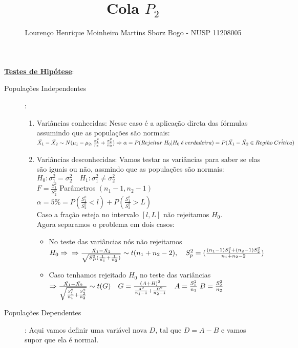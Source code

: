 \documentclass[12pt, oneside]{article}
\title{Cola $P_2$}
\author{Lourenço Henrique Moinheiro Martins Sborz Bogo - NUSP 11208005}
\newcommand{\mytitle}[1]{\textbf{\underline{#1}}}
\begin{document}
\maketitle
\mytitle{Testes de Hipótese}:\\
\begin{description}
\item[Populações Independentes]:
  \begin{enumerate}
  \item Variâncias conhecidas: Nesse caso é a aplicação direta das fórmulas assumindo que as populações são normais:\\
    $\bar{X_1}-\bar{X_2}\sim N(\mu_1-\mu_2,\frac{\sigma_1^2}{n_1}+\frac{\sigma_2^2}{n_2})\Rightarrow \alpha = P(Rejeitar \; H_0|H_0 \; \acute{e} \: verdadeira)\\ = P(\bar{X_1}-\bar{X_2} \in Regi\tilde{a}o\; Cr\acute{i}tica)$\\
  \item Variâncias desconhecidas: Vamos testar as variâncias para saber se elas são iguais ou não, assmindo que as populações são normais:\\
    $H_0: \sigma_1^2 = \sigma_2^2 \quad{H_1}: \sigma_1^2\neq\sigma_2^2$\\
    $F=\frac{S_1^2}{S_2^2}$ Parâmetros $(n_1-1,n_2-1)$\\
    $\alpha = 5\% = P(\frac{S_1^2}{S_2^2}<l)+P(\frac{S_1^2}{S_2^2}>L)$\\
    Caso a fração esteja no intervalo $[l,L]$ não rejeitamos $H_0$.\\
    Agora separamos o problema em dois casos:
    \begin{itemize}
    \item No teste das variâncias nós não rejeitamos $H_0\Rightarrow\\ \Rightarrow\frac{\bar{X_1}-\bar{X_2}}{\sqrt{S_P^2(\frac{1}{n_1}+\frac{1}{n_2})}}\sim t(n_1+n_2-2),\quad{} S_p^2=(\frac{(n_1-1)S_1^2+(n_2-1)S_2^2}{n_1+n_2-2})$
    \item Caso tenhamos rejeitado $H_0$ no teste das variâncias $\Rightarrow \frac{\bar{X_1}-\bar{X_2}}{\sqrt{\frac{S_1^2}{n_1}+\frac{S_2^2}{n_2}}}\sim t(G) \quad{} \\G=\frac{(A+B)^2}{\frac{A^2}{n_1-1}+\frac{B^2}{n_2-1}} \quad{} A=\frac{S_1^2}{n_1} \; B=\frac{S_2^2}{n_2}$
    \end{itemize}
  \end{enumerate}
\item[Populações Dependentes]: Aqui vamos definir uma variável nova $D$, tal que $D=A-B$ e vamos supor que ela é normal.
\end{description}
\end{document}
